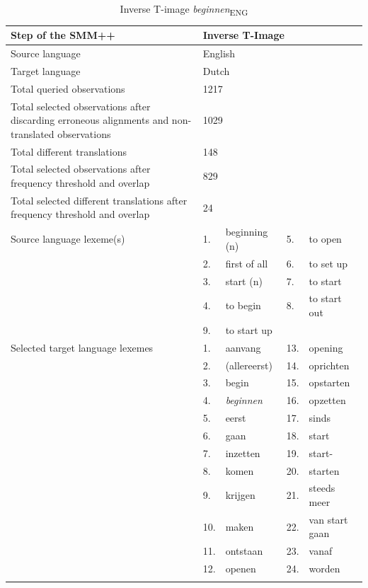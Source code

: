\begin{table}
\caption{Inverse T-image \textit{beginnen}\textsubscript{ENG}\label{tab:3:8}}
\small
\begin{tabularx}{\textwidth}{p{}lXlX}
\lsptoprule
Step of the SMM++ & \multicolumn{4}{l}{Inverse T-Image}\\ \midrule
\rowcolor{lsLightGray} Source language & \multicolumn{4}{l}{ English}\\
Target language & \multicolumn{4}{l}{ Dutch}\\
\rowcolor{lsLightGray} Total queried observations & \multicolumn{4}{l}{ 1217}\\
Total selected observations after discarding erroneous alignments and non-translated observations & \multicolumn{4}{l}{ 1029}\\
\rowcolor{lsLightGray} Total different translations & \multicolumn{4}{l}{ 148}\\
Total selected observations after frequency threshold and overlap & \multicolumn{4}{l}{ 829}\\
\rowcolor{lsLightGray} Total selected different translations after frequency threshold and overlap & \multicolumn{4}{l}{ 24}\\
Source language lexeme(s) & 1. & beginning (n) & 5. & to open \\
& 2. & first of all & 6. & to set up \\
& 3. & start (n) & 7. & to start \\
& 4. & to begin & 8. & to start out \\
& 9. & to start up & & \\
\rowcolor{lsLightGray}Selected target language lexemes & 1. &  aanvang & 13.& opening\\
\rowcolor{lsLightGray}& 2. & (allereerst) & 14.& oprichten\\
\rowcolor{lsLightGray}& 3. & begin & 15.& opstarten\\
\rowcolor{lsLightGray}& 4. & \textit{beginnen} & 16.& opzetten\\
\rowcolor{lsLightGray}& 5. & eerst & 17.& sinds\\
\rowcolor{lsLightGray}& 6. & gaan & 18.& start\\
\rowcolor{lsLightGray}& 7. & inzetten & 19.& start-\\
\rowcolor{lsLightGray}& 8. & komen & 20.& starten\\
\rowcolor{lsLightGray}& 9. & krijgen & 21.& steeds meer\\
\rowcolor{lsLightGray}& 10.& maken & 22.& van start gaan\\
\rowcolor{lsLightGray}& 11.& ontstaan & 23.& vanaf\\
\rowcolor{lsLightGray}& 12.& openen & 24.& worden\\
\lspbottomrule
\end{tabularx}
\end{table}

